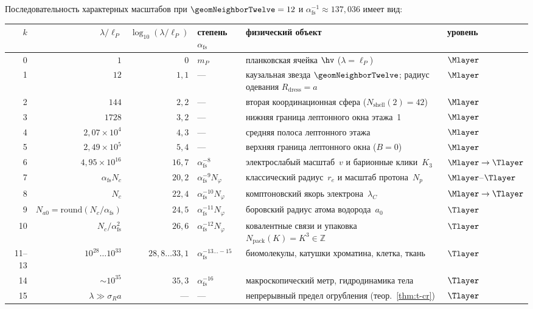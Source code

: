 \begin{proposition}
\label{prop:ladder-scale-steps}
Последовательность характерных масштабов при $\geomNeighborTwelve=12$ и $\alpha_{\mathrm{fs}}^{-1}\approx 137{,}036$ имеет вид:

\smallskip
\begin{center}
\footnotesize
\setlength{\tabcolsep}{4pt}
\begin{tabular}{@{}r r r l l l@{}}
\toprule
$k$ & $\lambda/\ell_P$ & $\log_{10}(\lambda/\ell_P)$ & степень $\alpha_{\mathrm{fs}}$ & физический объект & уровень \\
\midrule
0 & $1$ & $0$ & $m_P$ & планковская ячейка $\hv$ ($\lambda=\ell_P$) & $\Mlayer$ \\
1 & $12$ & $1{,}1$ & --- & каузальная звезда $\geomNeighborTwelve$; радиус одевания $R_{\mathrm{dress}}=a$ & $\Mlayer$ \\
2 & $144$ & $2{,}2$ & --- & вторая координационная сфера ($N_{\mathrm{shell}}(2)=42$) & $\Mlayer$ \\
3 & $1728$ & $3{,}2$ & --- & нижняя граница лептонного окна этажа~1 & $\Mlayer$ \\
4 & $2{,}07\times 10^4$ & $4{,}3$ & --- & средняя полоса лептонного этажа & $\Mlayer$ \\
5 & $2{,}49\times 10^5$ & $5{,}4$ & --- & верхняя граница лептонного окна ($B=0$) & $\Mlayer$ \\
6 & $4{,}95\times 10^{16}$ & $16{,}7$ & $\alpha_{\mathrm{fs}}^{-8}$ & электрослабый масштаб~$v$ и барионные клики~$K_3$ & $\Mlayer\to\Tlayer$ \\
7 & $\alpha_{\mathrm{fs}} N_c$ & $20{,}2$ & $\alpha_{\mathrm{fs}}^{-9}N_\varphi$ & классический радиус~$r_e$ и масштаб протона~$N_p$ & $\Mlayer$--$\Tlayer$ \\
8 & $N_c$ & $22{,}4$ & $\alpha_{\mathrm{fs}}^{-10}N_\varphi$ & комптоновский якорь электрона~$\lambda_C$ & $\Mlayer\to\Tlayer$ \\
9 & $N_{a0}=\mathrm{round}(N_c/\alpha_{\mathrm{fs}})$ & $24{,}5$ & $\alpha_{\mathrm{fs}}^{-11}N_\varphi$ & боровский радиус атома водорода~$a_0$ & $\Tlayer$ \\
10 & $N_c/\alpha_{\mathrm{fs}}^2$ & $26{,}6$ & $\alpha_{\mathrm{fs}}^{-12}N_\varphi$ & ковалентные связи и упаковка $N_{\mathrm{pack}}(K)=K^3\in\mathbb{Z}$ & $\Tlayer$ \\
11--13 & $10^{28}\ldots 10^{33}$ & $28{,}8\ldots 33{,}1$ & $\alpha_{\mathrm{fs}}^{-13\ldots -15}$ & биомолекулы, катушки хроматина, клетка, ткань & $\Tlayer$ \\
14 & $\sim 10^{35}$ & $35{,}3$ & $\alpha_{\mathrm{fs}}^{-16}$ & макроскопический метр, гидродинамика тела & $\Tlayer$ \\
15 & $\lambda\gg\sigma_R a$ & --- & --- & непрерывный предел огрубления (теор.~\ref{thm:t-cr}) & $\Tlayer$ \\
\bottomrule
\end{tabular}
\end{center}
\end{proposition}

